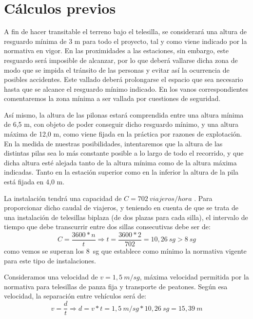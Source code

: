 \documentclass[a4paper,11pt]{article}
\begin{document}
\part{Cálculos previos}
A fin de hacer transitable el terreno bajo el telesilla, se considerará una altura de resguardo mínima de 3 m para todo el proyecto, tal y como viene indicado por la normativa en vigor. En las proximidades a las estaciones, sin embargo, este resguardo será imposible de alcanzar, por lo que deberá vallarse dicha zona de modo que se impida el tránsito de las personas y evitar así la ocurrencia de posibles accidentes. Este vallado deberá prolongarse el espacio que sea necesario hasta que se alcance el resguardo mínimo indicado. En los vanos correspondientes comentaremos la zona mínima a ser vallada por cuestiones de seguridad.\\
\par Así mismo, la altura de las pilonas estará comprendida entre una altura mínima de 6,5 m, con objeto de poder conseguir dicho resguardo mínimo, y una altura máxima de 12,0 m, como viene fijada en la práctica por razones de explotación. En la medida de nuestras posibilidades, intentaremos que la altura de las distintas pilas sea lo más constante posible a lo largo de todo el recorrido, y que dicha altura esté alejada tanto de la altura mínima como de la altura máxima indicadas. Tanto en la estación superior como en la inferior la altura de la pila está fijada en 4,0 m.\\
\par La instalación tendrá una capacidad de $C = 702~viajeros/hora$ . Para proporcionar dicho caudal de viajeros, y teniendo en cuenta de que se trata de una instalación de telesillas biplaza (de dos plazas para cada silla), el intervalo de tiempo que debe transcurrir entre dos sillas consecutivas debe ser de:
\begin{displaymath}
C=\frac{3600*n}{t} \Rightarrow t=\frac{3600*2}{702} = 10,26~sg > 8~sg
\end{displaymath}
como vemos se superan los 8~sg que establece como mínimo la normativa vigente para este tipo de instalaciones.\\
\par Consideramos una velocidad de $v = 1,5~m/sg$, máxima velocidad permitida por la normativa para telesillas de panza fija y transporte de peatones. Según esa velocidad, la separación entre vehículos será de:
\begin{displaymath}
v=\frac{d}{t} \Rightarrow d=v*t = 1,5~m/sg * 10,26~sg = 15,39~m 
\end{displaymath}
\end{document}
